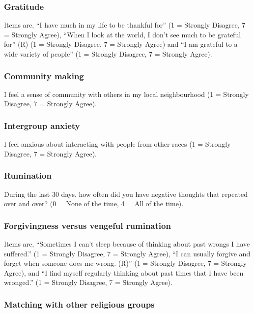 \documentclass[
]{interact}
\begin{document}
\subsubsection{Gratitude}\label{gratitude}

Items are, ``I have much in my life to be thankful for'' (1 = Strongly
Disagree, 7 = Strongly Agree), ``When I look at the world, I don't see
much to be grateful for'' (R) (1 = Strongly Disagree, 7 = Strongly
Agree) and ``I am grateful to a wide variety of people'' (1 = Strongly
Disagree, 7 = Strongly Agree).

\subsubsection{Community making}\label{community-making}

I feel a sense of community with others in my local neighbourhood (1 =
Strongly Disagree, 7 = Strongly Agree).

\subsubsection{Intergroup anxiety}\label{intergroup-anxiety}

I feel anxious about interacting with people from other races (1 =
Strongly Disagree, 7 = Strongly Agree).

\subsubsection{Rumination}\label{rumination}

During the last 30 days, how often did you have negative thoughts that
repeated over and over? (0 = None of the time, 4 = All of the time).

\subsubsection{Forgivingness versus vengeful
rumination}\label{forgivingness-versus-vengeful-rumination}

Items are, ``Sometimes I can't sleep because of thinking about past
wrongs I have suffered.'' (1 = Strongly Disagree, 7 = Strongly Agree),
``I can usually forgive and forget when someone does me wrong. (R)'' (1
= Strongly Disagree, 7 = Strongly Agree), and ``I find myself regularly
thinking about past times that I have been wronged.'' (1 = Strongly
Disagree, 7 = Strongly Agree).

\subsubsection{Matching with other religious
groups}\label{matching-with-other-religious-groups}
\end{document}
